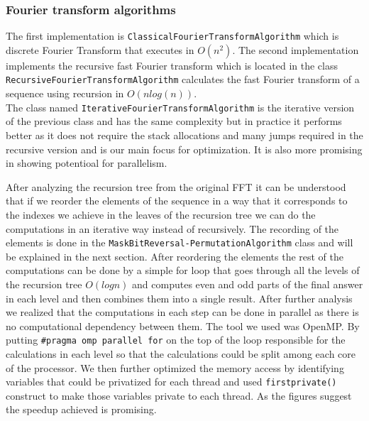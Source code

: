 \subsubsection{Fourier transform algorithms}
The first implementation is \texttt{ClassicalFourierTransformAlgorithm} which is discrete Fourier Transform that executes in $O(n ^2)$. The second implementation implements the recursive fast Fourier transform which is located in the class \texttt{RecursiveFourierTransformAlgorithm} calculates the fast Fourier transform of a sequence using recursion in $O(n log(n))$.  \\The class named \texttt{IterativeFourierTransformAlgorithm} is the iterative version of the previous class and has the same complexity but in practice it performs better as it does not require the stack allocations and many jumps required in the recursive version and is our main focus for optimization. It is also more promising in showing potentioal for parallelism.
\par After analyzing the recursion tree from the original FFT it can be understood that if we reorder the elements of the sequence in a way that it corresponds to the indexes we achieve in the leaves of the recursion tree we can do the computations in an iterative way instead of recursively. The recording of the elements is done in the \texttt{MaskBitReversal-PermutationAlgorithm} class and will be explained in the next section. After reordering the elements the rest of the computations can be done by a simple for loop that goes through all the levels of the recursion tree $O(log n)$ and computes even and odd parts of the final answer in each level and then combines them into a single result. After further analysis we realized that the computations in each step can be done in parallel as there is no computational dependency between them. The tool we used was OpenMP. By putting \texttt{\#pragma omp parallel for} on the top of the loop responsible for the calculations in each level so that the calculations could be split among each core of the processor. We then further optimized the memory access by identifying variables that could be privatized for each thread and used \texttt{firstprivate()} construct to make those variables private to each thread. As the figures suggest the speedup achieved is promising.

